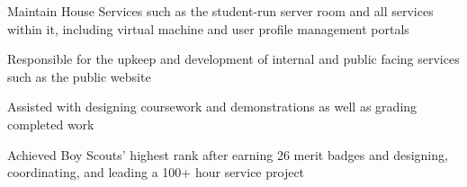 \medskip


\medskip


\smallskip
\smallskip


\medskip
{}

Maintain House Services such as the student-run server room and all services within it, including virtual machine and user profile management portals

\divider

Responsible for the upkeep and development of internal and public facing services such as the public website

\divider

Assisted with designing coursework and demonstrations as well as grading completed work

\divider

Achieved Boy Scouts' highest rank after earning 26 merit badges and designing, coordinating, and leading a 100+ hour service project


